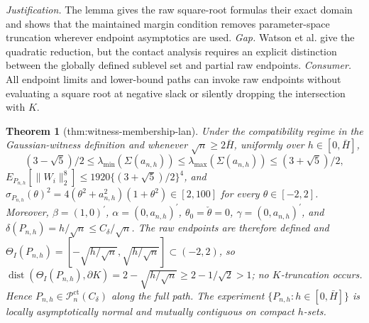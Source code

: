 \documentclass{article}
\newtheorem{theorem}{Theorem}
\begin{document}
\par\smallskip\noindent \textit{Justification.} The lemma gives the raw square-root formulas their exact domain and shows that the maintained margin condition removes parameter-space truncation wherever endpoint asymptotics are used. \textit{Gap.} Watson et al. give the quadratic reduction, but the contact analysis requires an explicit distinction between the globally defined sublevel set and partial raw endpoints. \textit{Consumer.} All endpoint limits and lower-bound paths can invoke raw endpoints without evaluating a square root at negative slack or silently dropping the intersection with \(K\).

\begin{theorem}[thm:witness-membership-lan]\label{thm:witness-membership-lan}
Under the compatibility regime in the Gaussian-witness definition and whenever \(\sqrt n\geq2\bar H\), uniformly over \(h\in[0,\bar H]\), \[(3-\sqrt5)/2\leq\lambda_{\min}(\Sigma(a_{n,h}))\leq\lambda_{\max}(\Sigma(a_{n,h}))\leq(3+\sqrt5)/2,\] \(E_{P_{n,h}}[\|W_i\|_2^8]\leq1920\{(3+\sqrt5)/2\}^4\), and \(\sigma_{P_{n,h}}(\theta)^2=4(\theta^2+a_{n,h}^2)(1+\theta^2)\in[2,100]\) for every \(\theta\in[-2,2]\). Moreover, \(\beta=(1,0)^{\prime}\), \(\alpha=(0,a_{n,h})^{\prime}\), \(\theta_0=\check\theta=0\), \(\gamma=(0,a_{n,h})^{\prime}\), and \(\delta(P_{n,h})=h/\sqrt n\leq C_{\delta}/\sqrt n\). The raw endpoints are therefore defined and \(\Theta_I(P_{n,h})=[-\sqrt{h/\sqrt n},\sqrt{h/\sqrt n}]\subset(-2,2)\), so \(\operatorname{dist}(\Theta_I(P_{n,h}),\partial K)=2-\sqrt{h/\sqrt n}\geq2-1/\sqrt2>1\); no \(K\)-truncation occurs. Hence \(P_{n,h}\in\mathcal P_n^{\mathrm{ct}}(C_{\delta})\) along the full path. The experiment \(\{P_{n,h}:h\in[0,\bar H]\}\) is locally asymptotically normal and mutually contiguous on compact \(h\)-sets.
\end{theorem}
\end{document}
